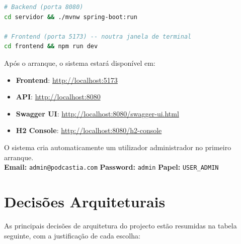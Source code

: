 \documentclass[12pt, a4paper]{report}
\begin{document}
\begin{lstlisting}[language=bash, caption={Iniciar o backend e o frontend}]
# Backend (porta 8080)
cd servidor && ./mvnw spring-boot:run

# Frontend (porta 5173) -- noutra janela de terminal
cd frontend && npm run dev
\end{lstlisting}

Após o arranque, o sistema estará disponível em:
\begin{itemize}
  \item \textbf{Frontend}: \url{http://localhost:5173}
  \item \textbf{API}: \url{http://localhost:8080}
  \item \textbf{Swagger UI}: \url{http://localhost:8080/swagger-ui.html}
  \item \textbf{H2 Console}: \url{http://localhost:8080/h2-console}
\end{itemize}

\begin{infobox}[title=Credenciais Padrão (DataSeeder)]
  O sistema cria automaticamente um utilizador administrador no primeiro arranque.\\[0.3cm]
  \textbf{Email:} \texttt{admin@podcastia.com} \quad
  \textbf{Password:} \texttt{admin} \quad
  \textbf{Papel:} \texttt{USER\_ADMIN}
\end{infobox}

\chapter{Decisões Arquiteturais}

As principais decisões de arquitetura do projecto estão resumidas na tabela
seguinte, com a justificação de cada escolha:
\end{document}
